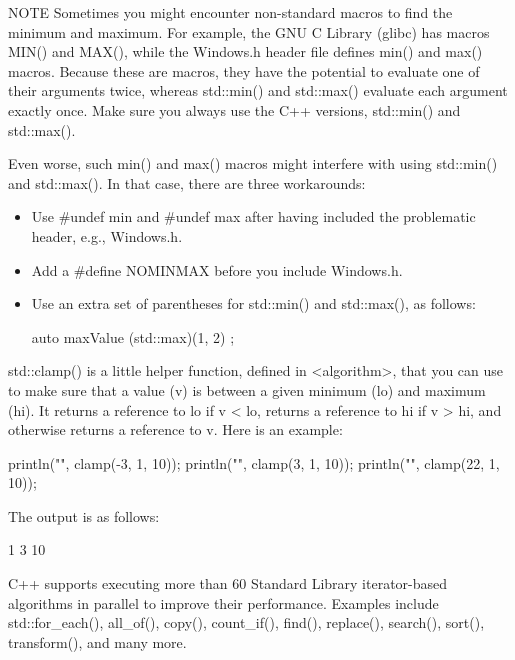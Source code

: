\begin{myNotic}{NOTE}
Sometimes you might encounter non-standard macros to find the minimum and maximum. For example, the GNU C Library (glibc) has macros MIN() and MAX(), while the Windows.h header file defines min() and max() macros. Because these are macros, they have the potential to evaluate one of their arguments twice, whereas std::min() and std::max() evaluate each argument exactly once. Make sure you always use the C++ versions, std::min() and std::max().

Even worse, such min() and max() macros might interfere with using std::min() and std::max(). In that case, there are three workarounds:

\begin{itemize}
\item
Use \#undef min and \#undef max after having included the problematic header, e.g., Windows.h.

\item
Add a \#define NOMINMAX before you include Windows.h.

\item
Use an extra set of parentheses for std::min() and std::max(), as follows:

\begin{cpp}
auto maxValue { (std::max)(1, 2) };
\end{cpp}
\end{itemize}
\end{myNotic}

std::clamp() is a little helper function, defined in <algorithm>, that you can use to make sure that a value (v) is between a given minimum (lo) and maximum (hi). It returns a reference to lo if v < lo, returns a reference to hi if v > hi, and otherwise returns a reference to v. Here is an example:

\begin{cpp}
println("{}", clamp(-3, 1, 10));
println("{}", clamp(3, 1, 10));
println("{}", clamp(22, 1, 10));
\end{cpp}

The output is as follows:

\begin{shell}
1
3
10
\end{shell}


C++ supports executing more than 60 Standard Library iterator-based algorithms in parallel to improve their performance. Examples include std::for\_each(), all\_of(), copy(), count\_if(), find(), replace(), search(), sort(), transform(), and many more.

